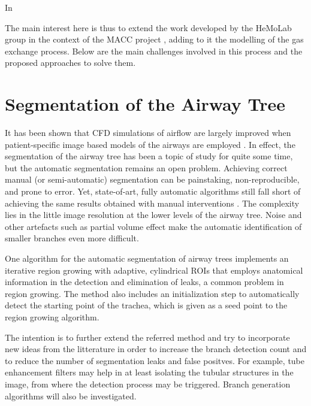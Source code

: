 In \citep{TawhaiM2011}

The main interest here is thus to extend the work developed by the HeMoLab group in the context of the MACC project \citep{Blanco2012,Blanco2010,Blanco2009a,Blanco2007,Golbert2012,Malossi2011,Urquiza2006}, adding to it the modelling of the gas exchange process. Below are the main challenges involved in this process and the proposed approaches to solve them.

\section{Segmentation of the Airway Tree}

\challenge

It has been shown that CFD simulations of airflow are largely improved when patient-specific image based models of the airways are employed \citep{Tawhai2010,Vial2005}. In effect, the segmentation of the airway tree has been a topic of study for quite some time, but the automatic segmentation remains an open problem. Achieving correct manual (or semi-automatic) segmentation can be painstaking, non-reproducible, and prone to error. Yet, state-of-art, fully automatic algorithms still fall short of achieving the same results obtained with manual interventions \citep{Lo}. The complexity lies in the little image resolution at the lower levels of the airway tree. Noise and other artefacts such as partial volume effect make the automatic identification of smaller branches even more difficult.

\approach

One algorithm for the automatic segmentation of airway trees \citep{Pinho:Airways2} implements an iterative region growing with adaptive, cylindrical ROIs that employs anatomical information in the detection and elimination of leaks, a common problem in region growing. The method also includes an initialization step to automatically detect the starting point of the trachea, which is given as a seed point to the region growing algorithm. 

The intention is to further extend the referred method and try to incorporate new ideas from the litterature \citep{Lo} in order to increase the branch detection count and to reduce the number of segmentation leaks and false positves. For example, tube enhancement filters \citep{ORLO-09} may help in at least isolating the tubular structures in the image, from where the detection process may be triggered. Branch generation algorithms \citep{Tawhai2000} will also be investigated.

